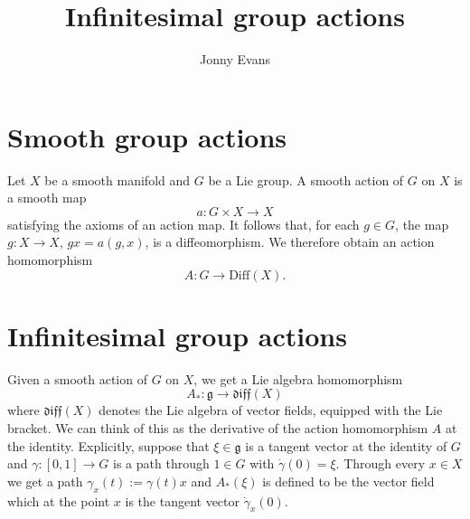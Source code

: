 \documentclass{article}
\title{Infinitesimal group actions}
\author{Jonny Evans}
\begin{document}
\section{Smooth group actions}

Let $X$ be a smooth manifold and $G$ be a Lie group. A smooth action of $G$ on $X$ is a smooth map
\[a\colon G\times X\to X\]
satisfying the axioms of an action map. It follows that, for each $g\in G$, the map $g\colon X\to X$, $gx=a(g,x)$, is a diffeomorphism. We therefore obtain an action homomorphism
\[A\colon G\to\mathrm{Diff}(X).\]

\section{Infinitesimal group actions}

Given a smooth action of $G$ on $X$, we get a Lie algebra homomorphism
\[A_*\colon\mathfrak{g}\to\mathfrak{diff}(X)\]
where $\mathfrak{diff}(X)$ denotes the Lie algebra of vector fields, equipped with the Lie bracket. We can think of this as the derivative of the action homomorphism $A$ at the identity. Explicitly, suppose that $\xi\in\mathfrak{g}$ is a tangent vector at the identity of $G$ and $\gamma\colon[0,1]\to G$ is a path through $1\in G$ with $\dot{\gamma}(0)=\xi$. Through every $x\in X$ we get a path $\gamma_x(t):=\gamma(t)x$ and $A_*(\xi)$ is defined to be the vector field which at the point $x$ is the tangent vector $\dot{\gamma}_x(0)$.
\end{document}
